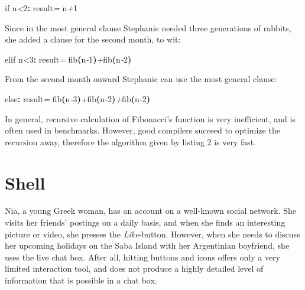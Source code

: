 \documentclass[
  12pt,
]{book}
\newenvironment{Shaded}{}{}
\newcommand{\CommentTok}[1]{\textcolor[rgb]{0.38,0.63,0.69}{\textit{#1}}}
\newcommand{\DataTypeTok}[1]{\textcolor[rgb]{0.56,0.13,0.00}{#1}}
\newcommand{\DecValTok}[1]{\textcolor[rgb]{0.25,0.63,0.44}{#1}}
\newcommand{\KeywordTok}[1]{\textcolor[rgb]{0.00,0.44,0.13}{\textbf{#1}}}
\newcommand{\NormalTok}[1]{#1}
\newcommand{\OtherTok}[1]{\textcolor[rgb]{0.00,0.44,0.13}{#1}}
\begin{document}
\begin{Shaded}
\begin{Highlighting}[]
  \DataTypeTok{if}\NormalTok{ n}\CommentTok{\textless{}}\DecValTok{2}\KeywordTok{:} \OtherTok{result}\CommentTok{=}\NormalTok{ n}\CommentTok{+}\DecValTok{1}
\end{Highlighting}
\end{Shaded}

Since in the most general clause Stephanie needed three generations of
rabbits, she added a clause for the second month, to wit:

\begin{Shaded}
\begin{Highlighting}[]
  \DataTypeTok{elif}\NormalTok{ n}\CommentTok{\textless{}}\DecValTok{3}\KeywordTok{:} \OtherTok{result}\CommentTok{=} \DataTypeTok{fib}\KeywordTok{(}\NormalTok{n}\CommentTok{{-}}\DecValTok{1}\KeywordTok{)}\CommentTok{+}\DataTypeTok{fib}\KeywordTok{(}\NormalTok{n}\CommentTok{{-}}\DecValTok{2}\KeywordTok{)}
\end{Highlighting}
\end{Shaded}

From the second month onward Stephanie can use the most general clause:

\begin{Shaded}
\begin{Highlighting}[]
  \DataTypeTok{else}\KeywordTok{:} \OtherTok{result}\CommentTok{=} \DataTypeTok{fib}\KeywordTok{(}\NormalTok{n}\CommentTok{{-}}\DecValTok{3}\KeywordTok{)}\CommentTok{+}\DataTypeTok{fib}\KeywordTok{(}\NormalTok{n}\CommentTok{{-}}\DecValTok{2}\KeywordTok{)}\CommentTok{+}\DataTypeTok{fib}\KeywordTok{(}\NormalTok{n}\CommentTok{{-}}\DecValTok{2}\KeywordTok{)}
\end{Highlighting}
\end{Shaded}

In general, recursive calculation of Fibonacci's function is very
inefficient, and is often used in benchmarks. However, good compilers
succeed to optimize the recursion away, therefore the algorithm given by
listing 2 is very fast.

\chapter{Shell}\label{shell}

Nia, a young Greek woman, has an account on a well-known social network.
She visits her friends' postings on a daily basis, and when she finds an
interesting picture or video, she presses the \emph{Like}-button.
However, when she needs to discuss her upcoming holidays on the Saba
Island with her Argentinian boyfriend, she uses the live chat box. After
all, hitting buttons and icons offers only a very limited interaction
tool, and does not produce a highly detailed level of information that
is possible in a chat box.
\end{document}
